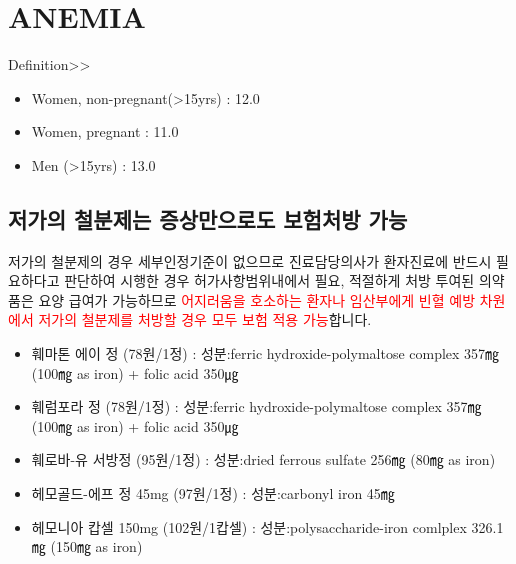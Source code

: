 \section{ANEMIA}
%
{
Definition>>\par
\begin{itemize}\tightlist
\item Women, non-pregnant(>15yrs) : 12.0
\item Women, pregnant : 11.0
\item Men (>15yrs) : 13.0
\end{itemize}
}
\prezi{\clearpage}
\subsection{저가의 철분제는 증상만으로도 보험처방 가능}
저가의 철분제의 경우 세부인정기준이 없으므로 진료담당의사가 환자진료에 반드시 필요하다고 판단하여 시행한 경우 허가사항범위내에서 필요, 적절하게 처방 투여된 의약품은 요양 급여가 가능하므로 \textcolor{red}{어지러움을 호소하는 환자나 임산부에게 빈혈 예방 차원에서 저가의 철분제를 처방할 경우 모두 보험 적용 가능}합니다.
\begin{itemize}\tightlist
\item 훼마톤 에이 정 (78원/1정) : 성분:ferric hydroxide-polymaltose complex 357㎎ (100㎎ as iron) + folic acid 350㎍ 
\item 훼럼포라 정 (78원/1정) : 성분:ferric hydroxide-polymaltose complex 357㎎ (100㎎ as iron) + folic acid 350㎍ 
\item 훼로바-유 서방정 (95원/1정) : 성분:dried ferrous sulfate 256㎎ (80㎎ as iron)
\item 헤모골드-에프 정 45mg (97원/1정) : 성분:carbonyl iron 45㎎
\item 헤모니아 캅셀 150mg (102원/1캅셀) : 성분:polysaccharide-iron comlplex 326.1㎎ (150㎎ as iron) 
\end{itemize}
\prezi{\clearpage}
